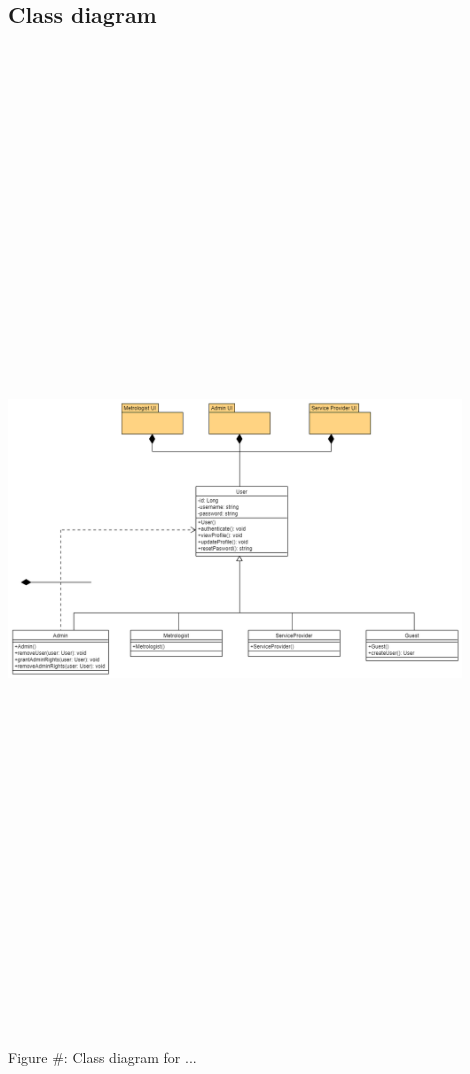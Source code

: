 \subsection{Class diagram}
 \includegraphics[width=12cm,height=26cm,keepaspectratio]{users_unit/Images/users class diagram.png}
	\begin{center}
	    \small{Figure #: Class diagram for ...}
    \end{center}
